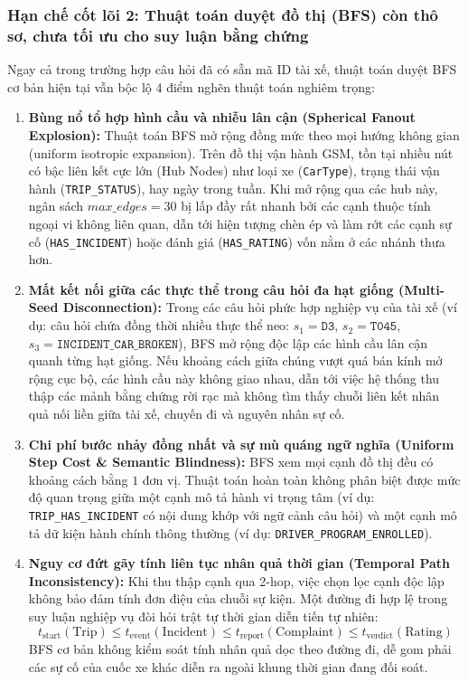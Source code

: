 \documentclass[a4paper,11pt]{article}
\begin{document}
\subsubsection{Hạn chế cốt lõi 2: Thuật toán duyệt đồ thị (BFS) còn thô sơ, chưa tối ưu cho suy luận bằng chứng}
\label{sec:limitation-bfs-flaws}
Ngay cả trong trường hợp câu hỏi đã có sẵn mã ID tài xế, thuật toán duyệt BFS cơ bản hiện tại vẫn bộc lộ 4 điểm nghẽn thuật toán nghiêm trọng:
\begin{enumerate}[leftmargin=1.5em]
    \item \textbf{Bùng nổ tổ hợp hình cầu và nhiễu lân cận (Spherical Fanout Explosion):} Thuật toán BFS mở rộng đồng mức theo mọi hướng không gian (uniform isotropic expansion). Trên đồ thị vận hành GSM, tồn tại nhiều nút có bậc liên kết cực lớn (Hub Nodes) như loại xe (\texttt{CarType}), trạng thái vận hành (\texttt{TRIP\_STATUS}), hay ngày trong tuần. Khi mở rộng qua các hub này, ngân sách $max\_edges = 30$ bị lấp đầy rất nhanh bởi các cạnh thuộc tính ngoại vi không liên quan, dẫn tới hiện tượng chèn ép và làm rớt các cạnh sự cố (\nolinkurl{HAS_INCIDENT}) hoặc đánh giá (\nolinkurl{HAS_RATING}) vốn nằm ở các nhánh thưa hơn.
    \item \textbf{Mất kết nối giữa các thực thể trong câu hỏi đa hạt giống (Multi-Seed Disconnection):} Trong các câu hỏi phức hợp nghiệp vụ của tài xế (ví dụ: câu hỏi chứa đồng thời nhiều thực thể neo: $s_1 = \texttt{D3}$, $s_2 = \texttt{T045}$, $s_3 = \texttt{INCIDENT\_CAR\_BROKEN}$), BFS mở rộng độc lập các hình cầu lân cận quanh từng hạt giống. Nếu khoảng cách giữa chúng vượt quá bán kính mở rộng cục bộ, các hình cầu này không giao nhau, dẫn tới việc hệ thống thu thập các mảnh bằng chứng rời rạc mà không tìm thấy chuỗi liên kết nhân quả nối liền giữa tài xế, chuyến đi và nguyên nhân sự cố.
    \item \textbf{Chi phí bước nhảy đồng nhất và sự mù quáng ngữ nghĩa (Uniform Step Cost \& Semantic Blindness):} BFS xem mọi cạnh đồ thị đều có khoảng cách bằng $1$ đơn vị. Thuật toán hoàn toàn không phân biệt được mức độ quan trọng giữa một cạnh mô tả hành vi trọng tâm (ví dụ: \texttt{TRIP\_HAS\_INCIDENT} có nội dung khớp với ngữ cảnh câu hỏi) và một cạnh mô tả dữ kiện hành chính thông thường (ví dụ: \texttt{DRIVER\_PROGRAM\_ENROLLED}).
    \item \textbf{Nguy cơ đứt gãy tính liên tục nhân quả thời gian (Temporal Path Inconsistency):} Khi thu thập cạnh qua 2-hop, việc chọn lọc cạnh độc lập không bảo đảm tính đơn điệu của chuỗi sự kiện. Một đường đi hợp lệ trong suy luận nghiệp vụ đòi hỏi trật tự thời gian diễn tiến tự nhiên:
    \begin{equation}
        t_{\text{start}}(\text{Trip}) \le t_{\text{event}}(\text{Incident}) \le t_{\text{report}}(\text{Complaint}) \le t_{\text{verdict}}(\text{Rating})
    \end{equation}
    BFS cơ bản không kiểm soát tính nhân quả dọc theo đường đi, dễ gom phải các sự cố của cuốc xe khác diễn ra ngoài khung thời gian đang đối soát.
\end{enumerate}
\end{document}
